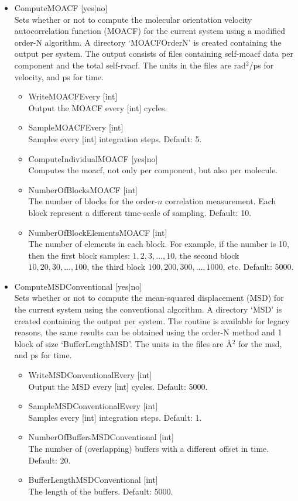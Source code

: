 \begin{itemize}
\item{ComputeMOACF [yes$|$no]}\\
Sets whether or not to compute the molecular orientation velocity autocorrelation function
(MOACF) for the current system using a modified order-N algorithm.
A directory `MOACFOrderN' is created containing the output per system. The output consists of files containing self-moacf data per
component and the total self-rvacf.
The units in the files are rad$^2$/ps for velocity, and ps for time.
  \begin{itemize}
    \item{WriteMOACFEvery [int]}\\
     Output the MOACF every [int] cycles.
    \item{SampleMOACFEvery [int]}\\
    Samples every [int] integration steps. Default: 5.
    \item{ComputeIndividualMOACF [yes$|$no]}\\
    Computes the moacf, not only per component, but also per molecule.
    \item{NumberOfBlocksMOACF [int]}\\
    The  number of blocks for the order-$n$ correlation measurement. Each block represent a different time-scale of sampling. Default: 10.
    \item{NumberOfBlockElementsMOACF [int]}\\
    The number of elements in each block. For example, if the number is 10, then the first block samples: $1,2,3,\dots,10$, the second block
    $10,20,30,\dots,100$, the third block $100,200,300,\dots,1000$, etc. Default: 5000.
   \end{itemize}


\item{ComputeMSDConventional [yes$|$no]}\\
Sets whether or not to compute the mean-squared displacement (MSD) for the current system using the conventional algorithm.
A directory `MSD' is created containing the output per system. The routine is available for legacy reasons,
the same results can be obtained using the order-N method and 1 block of size `BufferLengthMSD'.
The units in the files are \AA$^2$ for the msd, and ps for time.
  \begin{itemize}
    \item{WriteMSDConventionalEvery [int]}\\
     Output the MSD every [int] cycles. Default: 5000.
    \item{SampleMSDConventionalEvery [int]}\\
    Samples every [int] integration steps. Default: 1.
    \item{NumberOfBuffersMSDConventional [int]}\\
    The number of (overlapping) buffers with a different offset in time. Default: 20.
    \item{BufferLengthMSDConventional [int]}\\
    The length of the buffers. Default: 5000.
   \end{itemize}



\end{itemize}
